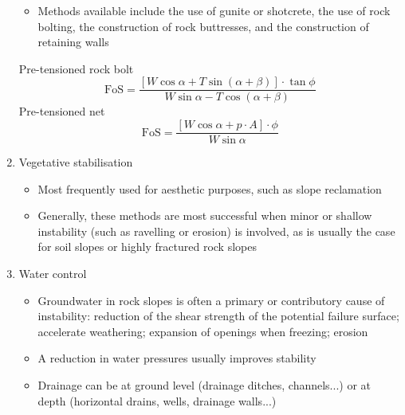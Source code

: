 \documentclass[10pt,landscape,a4paper]{article}
\begin{document}
\begin{multicols}{3}
\begin{enumerate}
\begin{itemize}
				\item Methods available include the use of gunite or shotcrete, the use of rock bolting, the construction of rock buttresses, and the construction of retaining walls
			\end{itemize}
			Pre-tensioned rock bolt
			\[
				\text{FoS}=\frac{\left[W\cos\alpha+T\sin(\alpha+\beta)\right]\cdot\tan\phi}{W\sin\alpha-T\cos(\alpha+\beta)}
			\]
			Pre-tensioned net
			\[
				\text{FoS}=\frac{\left[W\cos\alpha+p\cdot A\right]\cdot\phi}{W\sin\alpha}
			\]
			\item Vegetative stabilisation
			\begin{itemize}
				\item Most frequently used for aesthetic purposes, such as slope reclamation
				\item Generally, these methods are most successful when minor or shallow instability (such as ravelling or erosion) is involved, as is usually the case for soil slopes or highly fractured rock slopes
			\end{itemize}
			\item Water control
			\begin{itemize}
				\item Groundwater in rock slopes is often a primary or contributory cause of instability: reduction of the shear strength of the potential failure surface; accelerate weathering; expansion of openings when freezing; erosion
				\item A reduction in water pressures usually improves stability
				\item Drainage can be at ground level (drainage ditches, channels...) or at depth (horizontal drains, wells, drainage walls...)
			\end{itemize}
		\end{enumerate}
		
		\newpage
	\end{multicols}
\end{document}
